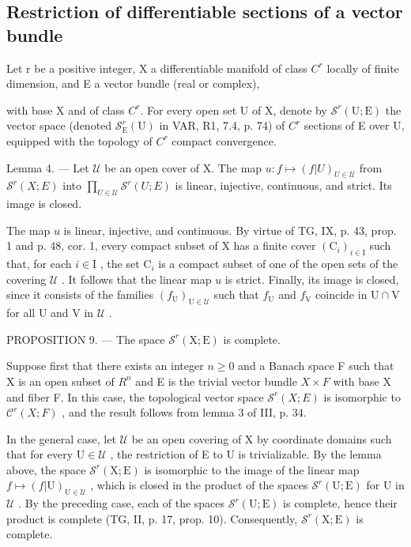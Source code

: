 \subsection{Restriction of differentiable sections of a vector bundle}

Let r be a positive integer, X a differentiable manifold of class \(C^{r}\) locally of finite dimension, and E a vector bundle (real or complex),

with base X and of class \(C^{r}\). For every open set U of X, denote by \(\mathcal{S}^{r}(\mathrm{U};\mathrm{E})\) the vector space (denoted \(\mathcal{S}_{\mathrm{E}}^{r}(\mathrm{U})\) in VAR, R1, 7.4, p. 74) of \(C^{r}\) sections of E over U, equipped with the topology of \(C^{r}\) compact convergence.

Lemma 4. --- Let \(\mathcal{U}\) be an open cover of X. The map \(u: f \mapsto (f|U)_{U \in \mathcal{U}}\) from \(\mathcal{S}^{r}(X;E)\) into \(\prod_{U \in \mathcal{U}} \mathcal{S}^{r}(U;E)\) is linear, injective, continuous, and strict. Its image is closed.

The map \(u\) is linear, injective, and continuous. By virtue of TG, IX, p. 43, prop. 1 and p. 48, cor. 1, every compact subset of X has a finite cover \((\mathrm{C}_i)_{i\in \mathrm{I}}\) such that, for each \(i\in \mathrm{I}\) , the set \(\mathrm{C}_i\) is a compact subset of one of the open sets of the covering \(\mathcal{U}\) . It follows that the linear map \(u\) is strict. Finally, its image is closed, since it consists of the families \((f_{\mathrm{U}})_{\mathrm{U}\in \mathcal{U}}\) such that \(f_{\mathrm{U}}\) and \(f_{\mathrm{V}}\) coincide in \(\mathrm{U}\cap \mathrm{V}\) for all U and V in \(\mathcal{U}\) .

PROPOSITION 9. --- The space \(\mathcal{S}^r(\mathrm{X};\mathrm{E})\) is complete.

Suppose first that there exists an integer \(n \geqslant 0\) and a Banach space F such that X is an open subset of \(R^{n}\) and E is the trivial vector bundle \(X \times F\) with base X and fiber F. In this case, the topological vector space \(\mathcal{S}^{r}(X;E)\) is isomorphic to \(\mathcal{C}^{r}(X;F)\) , and the result follows from lemma 3 of III, p. 34.

In the general case, let \(\mathcal{U}\) be an open covering of X by coordinate domains such that for every \(\mathrm{U} \in \mathcal{U}\) , the restriction of E to U is trivializable. By the lemma above, the space \(\mathcal{S}^r(\mathrm{X};\mathrm{E})\) is isomorphic to the image of the linear map \(f \mapsto (f|\mathrm{U})_{\mathrm{U} \in \mathcal{U}}\) , which is closed in the product of the spaces \(\mathcal{S}^r(\mathrm{U};\mathrm{E})\) for U in \(\mathcal{U}\) . By the preceding case, each of the spaces \(\mathcal{S}^r(\mathrm{U};\mathrm{E})\) is complete, hence their product is complete (TG, II, p. 17, prop. 10). Consequently, \(\mathcal{S}^r(\mathrm{X};\mathrm{E})\) is complete.

